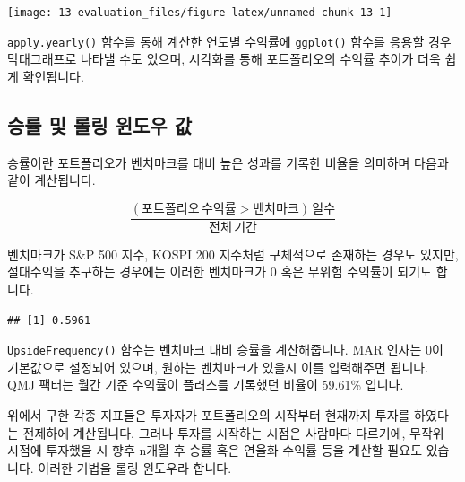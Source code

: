 \documentclass[12pt,]{book}
\newenvironment{Shaded}{\begin{snugshade}}{\end{snugshade}}
\newcommand{\DataTypeTok}[1]{\textcolor[rgb]{0.13,0.29,0.53}{#1}}
\newcommand{\DecValTok}[1]{\textcolor[rgb]{0.00,0.00,0.81}{#1}}
\newcommand{\KeywordTok}[1]{\textcolor[rgb]{0.13,0.29,0.53}{\textbf{#1}}}
\newcommand{\NormalTok}[1]{#1}
\newcommand{\OperatorTok}[1]{\textcolor[rgb]{0.81,0.36,0.00}{\textbf{#1}}}
\begin{document}
\begin{center}\texttt{[image: 13-evaluation\_files/figure-latex/unnamed-chunk-13-1]} \end{center}

\texttt{apply.yearly()} 함수를 통해 계산한 연도별 수익률에 \texttt{ggplot()} 함수를 응용할 경우 막대그래프로 나타낼 수도 있으며, 시각화를 통해 포트폴리오의 수익률 추이가 더욱 쉽게 확인됩니다.

\hypertarget{section-90}{%
\subsection{승률 및 롤링 윈도우 값}\label{section-90}}

승률이란 포트폴리오가 벤치마크를 대비 높은 성과를 기록한 비율을 의미하며 다음과 같이 계산됩니다.

\[\frac {(포트폴리오\,수익률 > 벤치마크)\,일수}{전체\,기간}\]

벤치마크가 S\&P 500 지수, KOSPI 200 지수처럼 구체적으로 존재하는 경우도 있지만, 절대수익을 추구하는 경우에는 이러한 벤치마크가 0 혹은 무위험 수익률이 되기도 합니다.

\begin{Shaded}
\end{Shaded}

\begin{verbatim}
## [1] 0.5961
\end{verbatim}

\texttt{UpsideFrequency()} 함수는 벤치마크 대비 승률을 계산해줍니다. MAR 인자는 0이 기본값으로 설정되어 있으며, 원하는 벤치마크가 있을시 이를 입력해주면 됩니다. QMJ 팩터는 월간 기준 수익률이 플러스를 기록했던 비율이 59.61\% 입니다.

위에서 구한 각종 지표들은 투자자가 포트폴리오의 시작부터 현재까지 투자를 하였다는 전제하에 계산됩니다. 그러나 투자를 시작하는 시점은 사람마다 다르기에, 무작위 시점에 투자했을 시 향후 n개월 후 승률 혹은 연율화 수익률 등을 계산할 필요도 있습니다. 이러한 기법을 롤링 윈도우라 합니다.
\end{document}

